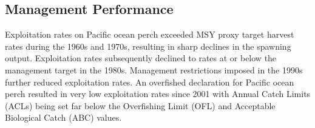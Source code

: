 \documentclass[12pt,]{article}
\begin{document}
\FloatBarrier

\subsection*{Management Performance}\label{management-performance}

Exploitation rates on Pacific ocean perch exceeded MSY proxy target
harvest rates during the 1960s and 1970s, resulting in sharp declines in
the spawning output. Exploitation rates subsequently declined to rates
at or below the management target in the 1980s. Management restrictions
imposed in the 1990s further reduced exploitation rates. An overfished
declaration for Pacific ocean perch resulted in very low exploitation
rates since 2001 with Annual Catch Limits (ACLs) being set far below the
Overfishing Limit (OFL) and Acceptable Biological Catch (ABC) values.

\begin{table}[ht]
\centering
\caption{Recent trend in total catch and  
                              landings (mt) relative to the management guidelines. 
                              Estimated total catch reflect the landings 
                              plus the model estimated discarded biomass.} 
\label{tab:mnmgt_perform}
\end{table}
\end{document}
